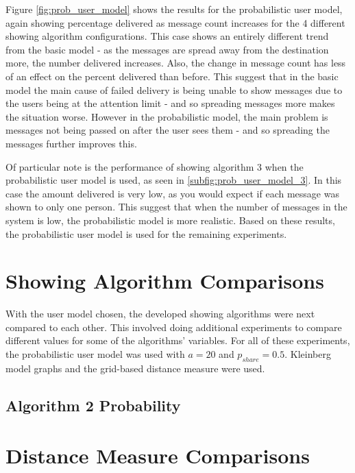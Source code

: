 \documentclass[bsc,frontabs,twoside,singlespacing,parskip,deptreport]{infthesis}     %
\begin{document}
Figure \ref{fig:prob_user_model} shows the results for the probabilistic user model, again showing percentage delivered as message count increases for the 4 different showing algorithm configurations. This case shows an entirely different trend from the basic model - as the messages are spread away from the destination more, the number delivered increases. Also, the change in message count has less of an effect on the percent delivered than before. This suggest that in the basic model the main cause of failed delivery is being unable to show messages due to the users being at the attention limit - and so spreading messages more makes the situation worse. However in the probabilistic model, the main problem is messages not being passed on after the user sees them - and so spreading the messages further improves this.

Of particular note is the performance of showing algorithm 3 when the probabilistic user model is used, as seen in \ref{subfig:prob_user_model_3}. In this case the amount delivered is very low, as you would expect if each message was shown to only one person. This suggest that when the number of messages in the system is low, the probabilistic model is more realistic. Based on these results, the probabilistic user model is used for the remaining experiments.

\section{Showing Algorithm Comparisons}

With the user model chosen, the developed showing algorithms were next compared to each other. This involved doing additional experiments to compare different values for some of the algorithms' variables. For all of these experiments, the probabilistic user model was used with $a = 20$ and $p_{share} = 0.5$. Kleinberg model graphs and the grid-based distance measure were used.

\subsection{Algorithm 2 Probability}


\section{Distance Measure Comparisons}




\end{document}
